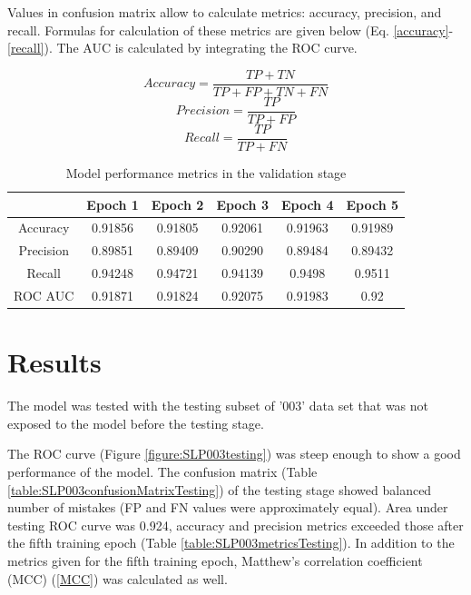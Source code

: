 \documentclass[12pt]{article}
\begin{document}
	Values in confusion matrix allow to calculate metrics: accuracy, precision,
	and recall. Formulas for calculation of these metrics are given below 
	(Eq. \ref{accuracy}-\ref{recall}).
	The AUC is calculated by integrating the ROC curve. 

	\begin{equation}
		Accuracy = \frac{TP+TN}{TP+FP+TN+FN} 
		\label{accuracy}
	\end{equation}
	\begin{equation}
		Precision = \frac{TP}{TP+FP} 
		\label{precision}
	\end{equation}
	\begin{equation}
		Recall = \frac{TP}{TP+FN} 
		\label{recall}
	\end{equation}

	\begin{table}[h!]
		\caption{Model performance metrics in the validation stage }
		\vspace{0.2cm}
		\centering
		\begin{tabular}{ | c | c c c c c | }
			\hline 
			& Epoch 1 & Epoch 2 & Epoch 3 & Epoch 4 & Epoch 5 \\
			\hline 
			Accuracy & 0.91856 & 0.91805 & 0.92061 & 0.91963 & 0.91989 \\
			Precision & 0.89851 & 0.89409 & 0.90290 & 0.89484 & 0.89432 \\
			Recall & 0.94248 & 0.94721 & 0.94139 & 0.9498 & 0.9511 \\  
			ROC AUC & 0.91871 & 0.91824 & 0.92075 & 0.91983 & 0.92 \\
			\hline 
		\end{tabular}
		\label{table:SLP003metricsValidation4}
	\end{table}

	\section{Results}

	The model was tested with the testing subset of '003' data set that was
	not exposed to the model before the testing stage. 

	The ROC curve (Figure \ref{figure:SLP003testing}) was steep enough to show
	a good performance of the model. The confusion matrix 
	(Table \ref{table:SLP003confusionMatrixTesting}) of the testing stage 
	showed balanced number of mistakes (FP and FN values were approximately 
	equal). Area under testing ROC curve was 0.924, 
	accuracy and precision metrics exceeded those after the fifth training 
	epoch (Table \ref{table:SLP003metricsTesting}). In addition to the metrics
	given for the fifth training epoch, Matthew's correlation coefficient (MCC)
	(\ref{MCC}) was calculated as well.
\end{document}

